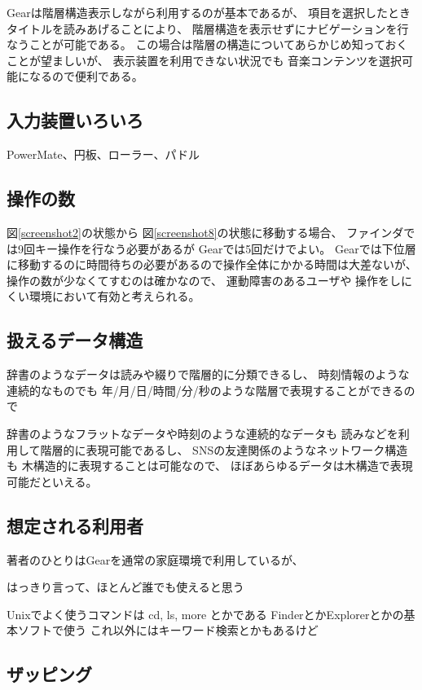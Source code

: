\documentclass[twoside]{wiss}
\def\GEAR{\textsf{Gear}}
\begin{document}
{\GEAR}は階層構造表示しながら利用するのが基本であるが、
項目を選択したときタイトルを読みあげることにより、
階層構造を表示せずにナビゲーションを行なうことが可能である。
この場合は階層の構造についてあらかじめ知っておくことが望ましいが、
表示装置を利用できない状況でも
音楽コンテンツを選択可能になるので便利である。

\subsection{入力装置いろいろ}

PowerMate、円板、ローラー、パドル

\subsection{操作の数}

図\ref{screenshot2}の状態から
図\ref{screenshot8}の状態に移動する場合、
ファインダでは9回キー操作を行なう必要があるが
{\GEAR}では5回だけでよい。
{\GEAR}では下位層に移動するのに時間待ちの必要があるので操作全体にかかる時間は大差ないが、
操作の数が少なくてすむのは確かなので、
運動障害のあるユーザや
操作をしにくい環境において有効と考えられる。

\subsection{扱えるデータ構造}

辞書のようなデータは読みや綴りで階層的に分類できるし、
時刻情報のような連続的なものでも
年/月/日/時間/分/秒のような階層で表現することができるので

辞書のようなフラットなデータや時刻のような連続的なデータも
読みなどを利用して階層的に表現可能であるし、
SNSの友達関係のようなネットワーク構造も
木構造的に表現することは可能なので、
ほぼあらゆるデータは木構造で表現可能だといえる。

\subsection{想定される利用者}

著者のひとりは{\GEAR}を通常の家庭環境で利用しているが、

  はっきり言って、ほとんど誰でも使えると思う

  Unixでよく使うコマンドは cd, ls, more とかである
  FinderとかExplorerとかの基本ソフトで使う
  これ以外にはキーワード検索とかもあるけど

\subsection{ザッピング}
\end{document}
